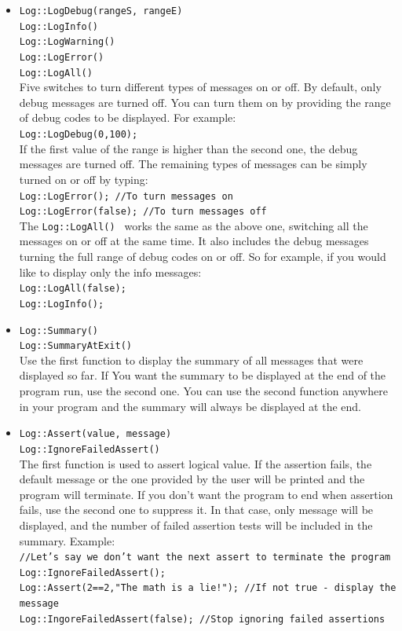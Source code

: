 \documentclass[]{Photos_interface_design}
\begin{document}
\begin{itemize}
 \item {\tt Log::LogDebug(rangeS, rangeE)} \hfill \\
       {\tt Log::LogInfo()} \hfill \\
       {\tt Log::LogWarning()} \hfill \\
       {\tt Log::LogError()} \hfill \\
       {\tt Log::LogAll()} \hfill \\
Five switches to turn different types of messages on or off. By default, only debug messages are turned off. You can turn them on by providing the range of debug codes to be displayed. For example: \\
{\tt Log::LogDebug(0,100); } \\
If the first value of the range is higher than the second one, the debug messages are turned off. The remaining types of messages can be simply turned on or off by typing: \\
{\tt Log::LogError();      //To turn messages on } \\
{\tt Log::LogError(false); //To turn messages off } \\
The {\tt Log::LogAll() } works the same as the above one, switching all the messages on or off at the same time. It also includes the debug messages turning the full range of debug codes on or off. So for example, if you would like to display only the info messages: \\
{\tt Log::LogAll(false); } \\
{\tt Log::LogInfo();     }

 \item {\tt Log::Summary() } \hfill \\
       {\tt Log::SummaryAtExit() } \hfill \\
Use the first function to display the summary of all messages that were displayed so far. If You want the summary to be displayed at the end of the program run, use the second one. You can use the second function anywhere in your program and the summary will always be displayed at the end.

 \item {\tt Log::Assert(value, message) } \hfill \\
       {\tt Log::IgnoreFailedAssert()   } \hfill \\
The first function is used to assert logical value. If the assertion fails, the default message or the one provided by the user will be printed and the program will terminate. If you don't want the program to end when assertion fails, use the second one to suppress it. In that case, only message will be displayed, and the number of failed assertion tests will be included in the summary. Example: \\
{\tt //Let's say we don't want the next assert to terminate the program } \\
{\tt Log::IgnoreFailedAssert(); } \\
{\tt Log::Assert(2==2,"The math is a lie!"); //If not true - display the message} \\
{\tt Log::IngoreFailedAssert(false); //Stop ignoring failed assertions} \\


\end{itemize}
\end{document}
